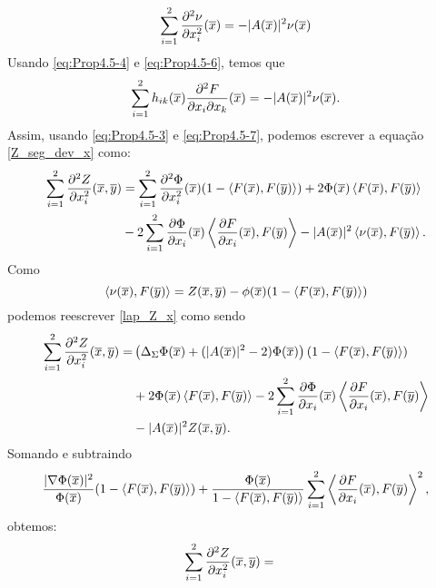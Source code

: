 \begin{demonstracao}
\begin{eqnarray} \label{eq:Prop4.5-6}	
\sum_{i=1}^2 \frac{\partial^2 \nu}{\partial x_i^2}(\overline{x}) = - | A(\overline{x}) |^2 \nu(\overline{x})
\end{eqnarray}
Usando \eqref{eq:Prop4.5-4} e \eqref{eq:Prop4.5-6}, temos que
\begin{eqnarray} \label{eq:Prop4.5-7}
\sum_{i=1}^2 h_{ik}(\overline{x}) \frac{\partial^2 F}{\partial x_i \partial x_k}(\overline{x}) 
= - | A(\overline{x}) |^2 \nu(\overline{x}).
\end{eqnarray}	
Assim, usando \eqref{eq:Prop4.5-3} e \eqref{eq:Prop4.5-7}, podemos
escrever a equa\c c\~ao \eqref{Z_seg_dev_x} como:
\begin{eqnarray}
\begin{aligned} \label{lap_Z_x}
\sum_{i=1}^2 \frac{\partial^2 Z}{\partial x_i^2}(\overline{x},\overline{y}) & =   
\sum_{i=1}^2 \frac{\partial^2 \Phi}{\partial x_i^2}(\overline{x})
(1 - \langle F(\overline{x}), F(\overline{y}) \rangle)    
+ 2  \Phi(\overline{x}) \left\langle F(\overline{x}), F(\overline{y}) \right\rangle \\
& -2 \sum_{i=1}^2 \frac{\partial \Phi}{\partial x_i}(\overline{x}) 
\left\langle \frac{\partial F}{\partial x_i}(\overline{x}), F(\overline{y}) \right\rangle
- | A(\overline{x}) |^2 \left\langle \nu(\overline{x}), F(\overline{y}) \right\rangle.
\end{aligned}
\end{eqnarray}
Como
\[
\left\langle \nu(\overline{x}), F(\overline{y}) \right\rangle = Z(\overline{x},\overline{y})
-\phi(\overline{x})(1-\langle F(\overline{x}),F(\overline{y})\rangle)
\]
podemos reescrever \eqref{lap_Z_x} como sendo
\begin{eqnarray*}
\begin{aligned}
\sum_{i=1}^2 \frac{\partial^2 Z}{\partial x_i^2}(\overline{x},\overline{y}) = &
\left(\Delta_{\Sigma} \Phi(\overline{x}) + 
(|A(\overline{x})|^2 - 2)\Phi(\overline{x})\right)(1 - \langle F(\overline{x}), F(\overline{y}) \rangle) \\
&+ 2 \Phi(\overline{x}) \left\langle F(\overline{x}), F(\overline{y}) \right\rangle
- 2 \sum_{i=1}^2 \frac{\partial \Phi}{\partial x_i}(\overline{x}) 
\left\langle \frac{\partial F}{\partial x_i}(\overline{x}), F(\overline{y}) \right\rangle \\
&- |A(\overline{x})|^2Z(\overline{x},\overline{y}).
\end{aligned}
\end{eqnarray*}	
Somando e subtraindo
\[
\frac{|\nabla \Phi(\overline{x})|^2}{\Phi(\overline{x})} (1 - \langle F(\overline{x}), F(\overline{y}) \rangle) + \frac{\Phi(\overline{x})}{1 - \langle F(\overline{x}),F(\overline{y}) \rangle} \sum_{i=1}^2 \left\langle \frac{\partial F}{\partial x_i} (\overline{x}), F(\overline{y}) \right\rangle^2,
\]
obtemos:
\begin{eqnarray*}
\begin{aligned}
\sum_{i=1}^2 \frac{\partial^2 Z}{\partial x_i^2}(\xb,\yb) &=

\end{aligned}
\end{eqnarray*}
\end{demonstracao}

